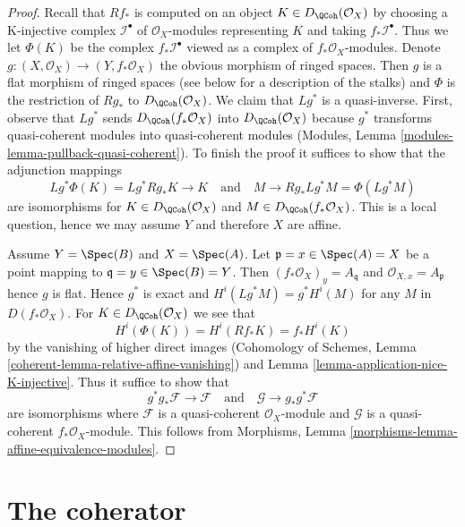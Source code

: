 \begin{proof}
Recall that $Rf_*$ is computed on an object $K \in D_\QCoh(\mathcal{O}_X)$
by choosing a K-injective complex $\mathcal{I}^\bullet$ of
$\mathcal{O}_X$-modules representing $K$ and taking $f_*\mathcal{I}^\bullet$.
Thus we let $\Phi(K)$ be the complex $f_*\mathcal{I}^\bullet$
viewed as a complex of $f_*\mathcal{O}_X$-modules.
Denote $g : (X, \mathcal{O}_X) \to (Y, f_*\mathcal{O}_X)$ the
obvious morphism of ringed spaces. Then $g$ is a flat morphism of
ringed spaces (see below for a description of the stalks) and
$\Phi$ is the restriction of $Rg_*$ to $D_\QCoh(\mathcal{O}_X)$.
We claim that $Lg^*$ is a quasi-inverse. First, observe that
$Lg^*$ sends $D_\QCoh(f_*\mathcal{O}_X)$ into $D_\QCoh(\mathcal{O}_X)$
because $g^*$ transforms quasi-coherent modules into quasi-coherent
modules (Modules, Lemma \ref{modules-lemma-pullback-quasi-coherent}).
To finish the proof it suffices to show that
the adjunction mappings
$$
Lg^*\Phi(K) = Lg^*Rg_*K \to K
\quad\text{and}\quad
M \to Rg_*Lg^*M = \Phi(Lg^*M)
$$
are isomorphisms for $K \in D_\QCoh(\mathcal{O}_X)$ and
$M \in D_\QCoh(f_*\mathcal{O}_X)$. This is a local question, hence
we may assume $Y$ and therefore $X$ are affine.

\medskip\noindent
Assume $Y = \Spec(B)$ and $X = \Spec(A)$. Let
$\mathfrak p = x \in \Spec(A) = X$ be a point mapping to
$\mathfrak q = y \in \Spec(B) = Y$. Then
$(f_*\mathcal{O}_X)_y = A_\mathfrak q$ and $\mathcal{O}_{X, x} = A_\mathfrak p$
hence $g$ is flat. Hence $g^*$ is exact and $H^i(Lg^*M) = g^*H^i(M)$
for any $M$ in $D(f_*\mathcal{O}_X)$.
For $K \in D_\QCoh(\mathcal{O}_X)$ we see that
$$
H^i(\Phi(K)) = H^i(Rf_*K) = f_*H^i(K)
$$
by the vanishing of higher direct images
(Cohomology of Schemes, Lemma \ref{coherent-lemma-relative-affine-vanishing})
and Lemma \ref{lemma-application-nice-K-injective}.
Thus it suffice to show that
$$
g^*g_*\mathcal{F} \to \mathcal{F}
\quad\text{and}\quad
\mathcal{G} \to g_*g^*\mathcal{F}
$$
are isomorphisms where $\mathcal{F}$ is
a quasi-coherent $\mathcal{O}_X$-module and $\mathcal{G}$ is
a quasi-coherent $f_*\mathcal{O}_X$-module. This follows from
Morphisms, Lemma \ref{morphisms-lemma-affine-equivalence-modules}.
\end{proof}





\section{The coherator}
\label{section-coherator}

